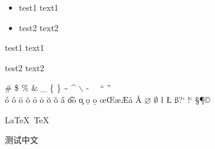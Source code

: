 \documentclass[twoside, paper=a4]{article}
\begin{document}
	\begin{itemize} 
		\item test1 text1 
		\item test2 text2 
	\end{itemize}
	
	\begin{description} 
		\item test1 text1 
		\item test2 text2
	\end{description}
	
	\# \$ \% \& \_ \{ \} \~{} \^{} $\backslash$ - \  \textendash \  \textemdash `` ''\\
	
	\'{o} \^{o} \"{o} \~{o} \={o} \.{o} \u{o} \v{o} \H{a} \t{oo} \c{o} \d{o} \b{o} \oe \OE \ae \AE \r{a} \r{A} $\varnothing$ $\emptyset$ \l{} \L{} \ss ?` !` \dag \ddag \S \P \copyright
	
	\LaTeX \ \TeX
	
	\begin{CJK*}{UTF8}{gbsn}
		测试中文
	\end{CJK*} 
	
\end{document}
